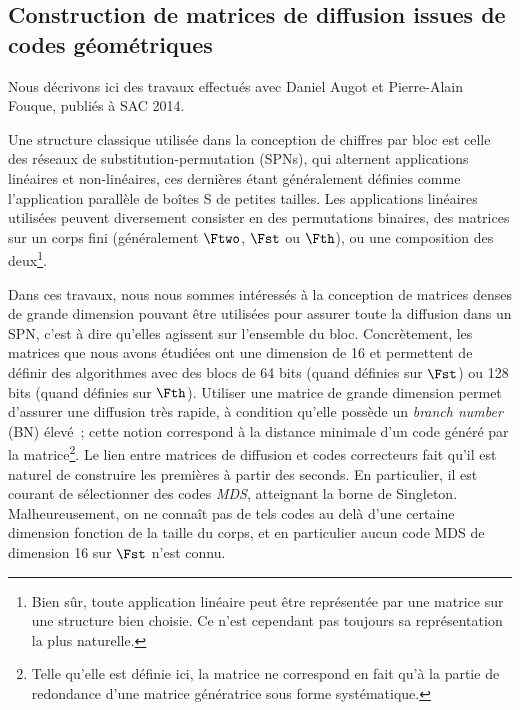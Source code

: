\subsection[{Construction de matrices de diffusion issues de codes géométriques \cite{DBLP:conf/sacrypt/AugotFK14}}]{Construction de matrices de diffusion issues de codes géométriques~\cite{DBLP:conf/sacrypt/AugotFK14}}

Nous décrivons ici des travaux effectués avec Daniel Augot et Pierre-Alain Fouque, publiés à SAC 2014.

\medskip

Une structure classique utilisée dans la conception de chiffres par bloc est celle des réseaux de substitution-permutation (SPNs),
qui alternent applications linéaires et non-linéaires, ces dernières étant
généralement définies comme l'application parallèle de boîtes S de petites tailles. Les applications linéaires utilisées peuvent diversement consister en des permutations binaires, des matrices sur
un corps fini (généralement $\Ftwo$, $\Fst$ ou $\Fth$), ou une composition des deux\footnote{Bien sûr, toute application linéaire peut être représentée par une matrice sur une structure bien choisie. Ce n'est
cependant pas toujours sa représentation la plus naturelle.}.

Dans ces travaux, nous nous sommes intéressés à la conception de matrices denses
de grande dimension pouvant être utilisées pour assurer toute la diffusion dans un SPN, c'est à dire qu'elles agissent sur l'ensemble du bloc. Concrètement, les matrices que nous
avons étudiées ont une dimension de 16
et permettent de définir des algorithmes avec des blocs de 64 bits (quand définies sur $\Fst$) ou 128 bits (quand définies sur $\Fth$).
Utiliser une matrice de grande dimension permet d'assurer une diffusion très rapide, à condition qu'elle possède un \emph{branch number} (BN) élevé~; cette notion correspond à la
distance minimale d'un code généré par la matrice\footnote{Telle qu'elle est définie ici, la matrice ne correspond en fait qu'à
la partie de redondance d'une matrice génératrice sous forme systématique.}.
Le lien entre matrices de diffusion et codes correcteurs fait qu'il est naturel de construire les premières à partir des seconds. En particulier, il est courant de sélectionner
des codes \emph{MDS}, atteignant la borne de Singleton. Malheureusement, on ne connaît pas de tels codes au delà d'une certaine dimension fonction de la taille du corps, et en particulier
aucun code MDS de dimension 16 sur $\Fst$ n'est connu.


